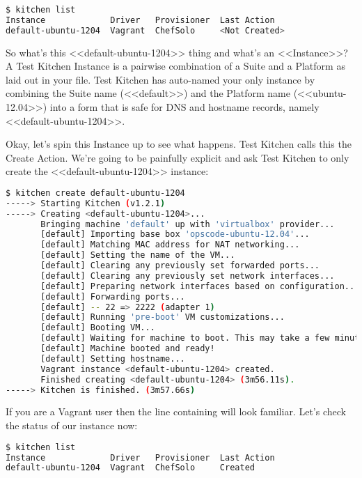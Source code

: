 \begin{lstlisting}[language=Bash,label=lst:testing-test-kitchen6]
$ kitchen list
Instance             Driver   Provisioner  Last Action
default-ubuntu-1204  Vagrant  ChefSolo     <Not Created>
\end{lstlisting}

So what's this <<default-ubuntu-1204>> thing and what's an <<Instance>>? A Test Kitchen Instance is a pairwise combination of a Suite and a Platform as laid out in your  file. Test Kitchen has auto-named your only instance by combining the Suite name (<<default>>) and the Platform name (<<ubuntu-12.04>>) into a form that is safe for DNS and hostname records, namely <<default-ubuntu-1204>>.

Okay, let's spin this Instance up to see what happens. Test Kitchen calls this the Create Action. We're going to be painfully explicit and ask Test Kitchen to only create the <<default-ubuntu-1204>> instance:

\begin{lstlisting}[language=Bash,label=lst:testing-test-kitchen7]
$ kitchen create default-ubuntu-1204
-----> Starting Kitchen (v1.2.1)
-----> Creating <default-ubuntu-1204>...
       Bringing machine 'default' up with 'virtualbox' provider...
       [default] Importing base box 'opscode-ubuntu-12.04'...
       [default] Matching MAC address for NAT networking...
       [default] Setting the name of the VM...
       [default] Clearing any previously set forwarded ports...
       [default] Clearing any previously set network interfaces...
       [default] Preparing network interfaces based on configuration...
       [default] Forwarding ports...
       [default] -- 22 => 2222 (adapter 1)
       [default] Running 'pre-boot' VM customizations...
       [default] Booting VM...
       [default] Waiting for machine to boot. This may take a few minutes...
       [default] Machine booted and ready!
       [default] Setting hostname...
       Vagrant instance <default-ubuntu-1204> created.
       Finished creating <default-ubuntu-1204> (3m56.11s).
-----> Kitchen is finished. (3m57.66s)
\end{lstlisting}

If you are a Vagrant user then the line containing  will look familiar. Let's check the status of our instance now:

\begin{lstlisting}[language=Bash,label=lst:testing-test-kitchen8]
$ kitchen list
Instance             Driver   Provisioner  Last Action
default-ubuntu-1204  Vagrant  ChefSolo     Created
\end{lstlisting}





